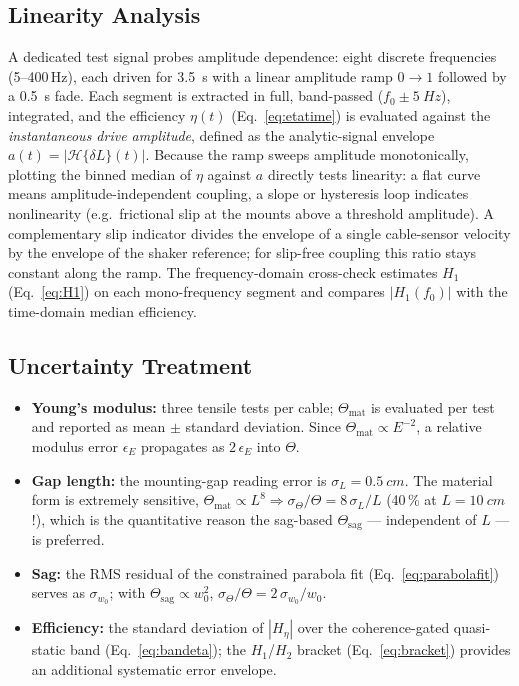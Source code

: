 \subsection{Linearity Analysis}
\label{sec:proc:linearity}

A dedicated test signal probes amplitude dependence: eight discrete
frequencies (5--400\,\si{Hz}), each driven for \SI{3.5}{s} with a linear
amplitude ramp $0 \to 1$ followed by a \SI{0.5}{s} fade. Each segment is
extracted in full, band-passed ($f_0 \pm \SI{5}{Hz}$), integrated, and the
efficiency $\eta(t)$ (Eq.~\ref{eq:etatime}) is evaluated against the
\emph{instantaneous drive amplitude}, defined as the analytic-signal envelope
$a(t) = |\mathcal{H}\{\delta L\}(t)|$. Because the ramp sweeps amplitude
monotonically, plotting the binned median of $\eta$ against $a$ directly
tests linearity: a flat curve means amplitude-independent coupling, a slope
or hysteresis loop indicates nonlinearity (e.g.\ frictional slip at the
mounts above a threshold amplitude). A complementary slip indicator divides
the envelope of a single cable-sensor velocity by the envelope of the shaker
reference; for slip-free coupling this ratio stays constant along the ramp.
The frequency-domain cross-check estimates $H_1$
(Eq.~\ref{eq:H1}) on each mono-frequency segment and compares
$|H_1(f_0)|$ with the time-domain median efficiency.

\subsection{Uncertainty Treatment}
\label{sec:proc:uncertainty}

\begin{itemize}
  \item \textbf{Young's modulus:} three tensile tests per cable;
    $\Theta_\mathrm{mat}$ is evaluated per test and reported as mean $\pm$
    standard deviation. Since $\Theta_\mathrm{mat} \propto E^{-2}$, a
    relative modulus error $\epsilon_E$ propagates as
    $2\,\epsilon_E$ into $\Theta$.
  \item \textbf{Gap length:} the mounting-gap reading error is
    $\sigma_L = \SI{0.5}{cm}$. The material form is extremely sensitive,
    $\Theta_\mathrm{mat} \propto L^8 \Rightarrow
    \sigma_\Theta/\Theta = 8\,\sigma_L/L$ (40\,\% at $L=\SI{10}{cm}$!),
    which is the quantitative reason the sag-based
    $\Theta_\mathrm{sag}$ — independent of $L$ — is preferred.
  \item \textbf{Sag:} the RMS residual of the constrained parabola fit
    (Eq.~\ref{eq:parabolafit}) serves as $\sigma_{w_0}$; with
    $\Theta_\mathrm{sag} \propto w_0^2$,
    $\sigma_\Theta/\Theta = 2\,\sigma_{w_0}/w_0$.
  \item \textbf{Efficiency:} the standard deviation of $|H_\eta|$ over the
    coherence-gated quasi-static band (Eq.~\ref{eq:bandeta}); the
    $H_1$/$H_2$ bracket (Eq.~\ref{eq:bracket}) provides an additional
    systematic error envelope.
\end{itemize}

